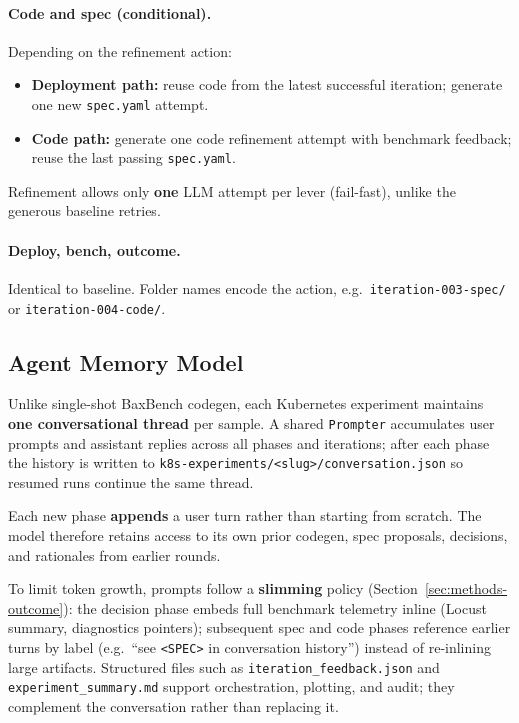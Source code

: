 \paragraph{Code and spec (conditional).}
Depending on the refinement action:
\begin{itemize}
  \item \textbf{Deployment path:} reuse code from the latest successful
        iteration; generate one new \texttt{spec.yaml} attempt.
  \item \textbf{Code path:} generate one code refinement attempt with
        benchmark feedback; reuse the last passing \texttt{spec.yaml}.
\end{itemize}
Refinement allows only \textbf{one} LLM attempt per lever (fail-fast), unlike
the generous baseline retries.

\paragraph{Deploy, bench, outcome.}
Identical to baseline.  Folder names encode the action, e.g.\
\texttt{iteration-003-spec/} or \texttt{iteration-004-code/}.

\subsection{Agent Memory Model}

Unlike single-shot BaxBench codegen, each Kubernetes experiment maintains
\textbf{one conversational thread} per sample.  A shared \texttt{Prompter}
accumulates user prompts and assistant replies across all phases and iterations;
after each phase the history is written to
\texttt{k8s-experiments/<slug>/conversation.json} so resumed runs continue
the same thread.

Each new phase \textbf{appends} a user turn rather than starting from scratch.
The model therefore retains access to its own prior codegen, spec proposals,
decisions, and rationales from earlier rounds.

To limit token growth, prompts follow a \textbf{slimming} policy
(Section~\ref{sec:methods-outcome}): the decision phase embeds full benchmark
telemetry inline (Locust summary, diagnostics pointers); subsequent spec and
code phases reference earlier turns by label (e.g.\ ``see \texttt{<SPEC>} in
conversation history'') instead of re-inlining large artifacts.  Structured
files such as \texttt{iteration\_feedback.json} and
\texttt{experiment\_summary.md} support orchestration, plotting, and audit;
they complement the conversation rather than replacing it.

